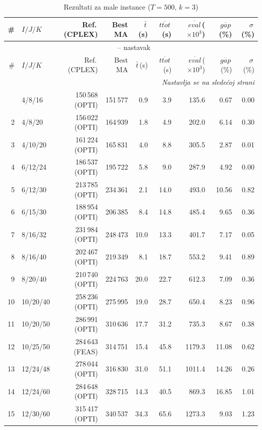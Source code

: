 \documentclass[12pt,a4paper]{article}
\begin{document}
\begin{longtable}{r l r r r r r r r}
\caption{Rezultati za male instance ($T=500$, $k=3$)} \\
\toprule
\# & $I/J/K$ & Ref.\,(CPLEX) & Best MA & $\bar t$\,(s) & $\overline{ttot}$\,(s) & $\overline{eval}$\,($\times 10^3$) & $\overline{gap}$\,(\%) & $\sigma$\,(\%) \\
\midrule
\endfirsthead
\multicolumn{9}{c}{\tablename\ \thetable{} -- nastavak} \\
\toprule
\# & $I/J/K$ & Ref.\,(CPLEX) & Best MA & $\bar t$\,(s) & $\overline{ttot}$\,(s) & $\overline{eval}$\,($\times 10^3$) & $\overline{gap}$\,(\%) & $\sigma$\,(\%) \\
\midrule
\endhead
\midrule
\multicolumn{9}{r}{\textit{Nastavlja se na sledećoj strani}} \\
\endfoot
\bottomrule
\endlastfoot
1 & 4/8/16 & 150\,568 (OPTI) & 151\,577 & 0.9 & 3.9 & 135.6 & 0.67 & 0.00 \\
2 & 4/8/20 & 156\,022 (OPTI) & 164\,939 & 1.8 & 4.9 & 202.0 & 6.14 & 0.30 \\
3 & 4/10/20 & 161\,224 (OPTI) & 165\,831 & 4.0 & 8.8 & 305.5 & 2.87 & 0.01 \\
4 & 6/12/24 & 186\,537 (OPTI) & 195\,722 & 5.8 & 9.0 & 287.9 & 4.92 & 0.00 \\
5 & 6/12/30 & 213\,785 (OPTI) & 234\,361 & 2.1 & 14.0 & 493.0 & 10.56 & 0.82 \\
6 & 6/15/30 & 188\,954 (OPTI) & 206\,385 & 8.4 & 14.8 & 485.4 & 9.65 & 0.36 \\
7 & 8/16/32 & 231\,984 (OPTI) & 248\,473 & 10.0 & 13.3 & 401.7 & 7.17 & 0.05 \\
8 & 8/16/40 & 202\,467 (OPTI) & 219\,349 & 8.1 & 18.7 & 553.2 & 9.41 & 0.89 \\
9 & 8/20/40 & 210\,740 (OPTI) & 224\,763 & 20.0 & 22.7 & 612.3 & 7.09 & 0.36 \\
10 & 10/20/40 & 258\,236 (OPTI) & 275\,995 & 19.0 & 28.7 & 650.4 & 8.23 & 0.96 \\
11 & 10/20/50 & 286\,991 (OPTI) & 310\,636 & 17.7 & 31.2 & 735.3 & 8.67 & 0.38 \\
12 & 10/25/50 & 284\,643 (FEAS) & 314\,751 & 15.4 & 45.8 & 1179.3 & 11.08 & 0.62 \\
13 & 12/24/48 & 278\,044 (OPTI) & 316\,830 & 31.0 & 51.1 & 1011.4 & 14.26 & 0.26 \\
14 & 12/24/60 & 284\,648 (OPTI) & 328\,715 & 14.3 & 40.5 & 869.3 & 16.85 & 1.01 \\
15 & 12/30/60 & 315\,417 (OPTI) & 340\,537 & 34.3 & 65.6 & 1273.3 & 9.03 & 1.23 \\

\end{longtable}
\end{document}
